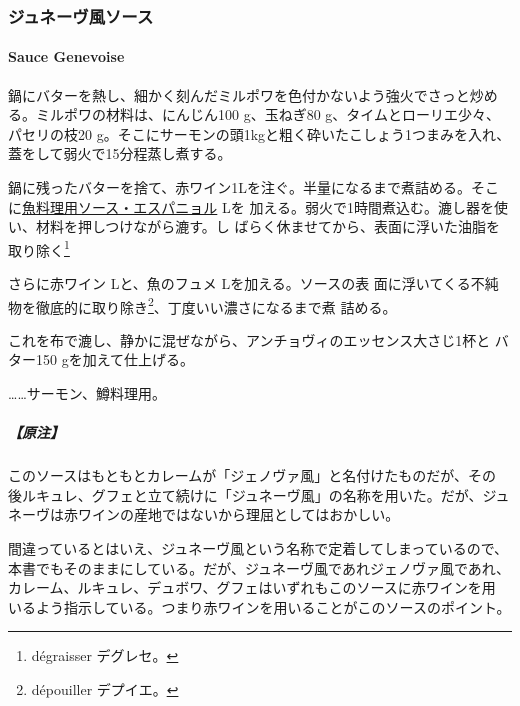 \begin{recette}
\maeaki

\hypertarget{ux30b8ux30e5ux30cdux30fcux30f4ux98a8ux30bdux30fcux30b9}{%
\subsubsection{ジュネーヴ風ソース}\label{ux30b8ux30e5ux30cdux30fcux30f4ux98a8ux30bdux30fcux30b9}}

\hypertarget{sauce-genevoise}{%
\paragraph{Sauce Genevoise}\label{sauce-genevoise}}

   

鍋にバターを熱し、細かく刻んだミルポワを色付かないよう強火でさっと炒め
る。ミルポワの材料は、にんじん100 g、玉ねぎ80 g、タイムとローリエ少々、
パセリの枝20 g。そこにサーモンの頭1kgと粗く砕いたこしょう1つまみを入れ、
蓋をして弱火で15分程蒸し煮する。

鍋に残ったバターを捨て、赤ワイン1Lを注ぐ。半量になるまで煮詰める。そこ
に\protect\hyperlink{sauce-espagnole-maigre}{魚料理用ソース・エスパニョル}\undemi{}
Lを
加える。弱火で1時間煮込む。漉し器を使い、材料を押しつけながら漉す。し
ばらく休ませてから、表面に浮いた油脂を取り除く\footnote{dégraisser
  デグレセ。}

さらに赤ワイン\undemi{} Lと、魚のフュメ\undemi{} Lを加える。ソースの表
面に浮いてくる不純物を徹底的に取り除き\footnote{dépouiller デプイエ。}、丁度いい濃さになるまで煮
詰める。

これを布で漉し、静かに混ぜながら、アンチョヴィのエッセンス大さじ1杯と
バター150 gを加えて仕上げる。

\ldots{}\ldots{}サーモン、鱒料理用。

\hypertarget{ux539fux6ce8-3}{%
\subparagraph{【原注】}\label{ux539fux6ce8-3}}

このソースはもともとカレームが「ジェノヴァ風」と名付けたものだが、その
後ルキュレ、グフェと立て続けに「ジュネーヴ風」の名称を用いた。だが、ジュ
ネーヴは赤ワインの産地ではないから理屈としてはおかしい。

間違っているとはいえ、ジュネーヴ風という名称で定着してしまっているので、
本書でもそのままにしている。だが、ジュネーヴ風であれジェノヴァ風であれ、
カレーム、ルキュレ、デュボワ、グフェはいずれもこのソースに赤ワインを用
いるよう指示している。つまり赤ワインを用いることがこのソースのポイント。


\end{recette}

